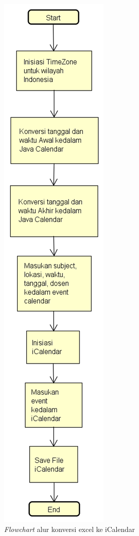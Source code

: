 \begin{figure}[H]
	\centering
	\includegraphics[scale=0.4]{Gambar/FlowchartConvertiCalendar}
	\caption{\textit{Flowchart} alur konversi excel ke iCalendar}
	\label{fig:flowchartKonversiiCalendar}
	\end{figure}
